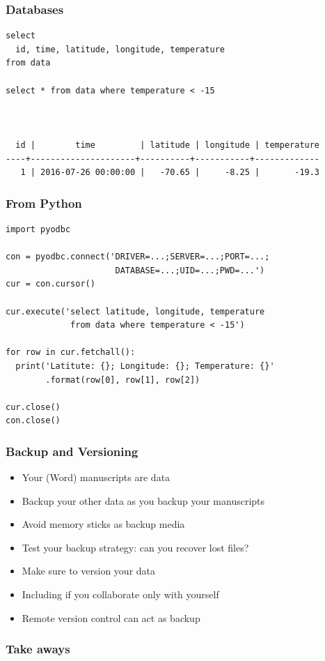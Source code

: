 \documentclass{beamer}
\begin{document}
\begin{frame}[fragile]
  \frametitle{Databases}
  
  \small
  \begin{verbatim}
select 
  id, time, latitude, longitude, temperature
from data
  
select * from data where temperature < -15
  
  
  
  id |        time         | latitude | longitude | temperature 
----+---------------------+----------+-----------+-------------
   1 | 2016-07-26 00:00:00 |   -70.65 |     -8.25 |       -19.3 
  \end{verbatim}
\end{frame}

\begin{frame}[fragile]
  \frametitle{From Python}
  
  \small
  \begin{verbatim}
import pyodbc

con = pyodbc.connect('DRIVER=...;SERVER=...;PORT=...;
                      DATABASE=...;UID=...;PWD=...')
cur = con.cursor()

cur.execute('select latitude, longitude, temperature 
             from data where temperature < -15')

for row in cur.fetchall():
  print('Latitute: {}; Longitude: {}; Temperature: {}'
        .format(row[0], row[1], row[2])

cur.close()
con.close()
  \end{verbatim}
\end{frame}

\begin{frame}
  \frametitle{Backup and Versioning}
  
  \begin{itemize}
  \item Your (Word) manuscripts are data
  \item Backup your other data as you backup your manuscripts
  \item Avoid memory sticks as backup media
  \item Test your backup strategy: can you recover lost files?
  \item Make sure to version your data
  \item Including if you collaborate only with yourself
  \item Remote version control can act as backup
  \end{itemize}
\end{frame}

\begin{frame}
  \frametitle{Take aways}
  
\end{frame}
\end{document}
